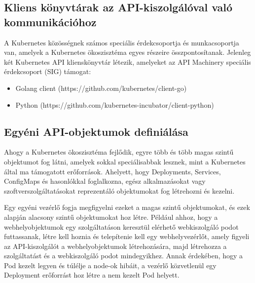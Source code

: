 \subsection{Kliens könyvtárak az API-kiszolgálóval való kommunikációhoz}
A Kubernetes közösségnek számos speciális érdekcsoportja és munkacsoportja van, amelyek a Kubernetes ökoszisztéma egyes részeire összpontosítanak. Jelenleg két Kubernetes API klienskönyvtár létezik, amelyeket az API Machinery speciális érdekcsoport (SIG) támogat:
\cite{Marko17}

\begin{itemize}
    \item Golang client (https://github.com/kubernetes/client-go)
    \item Python (https://github.com/kubernetes-incubator/client-python)
\end{itemize}

\subsection{Egyéni API-objektumok definiálása}
Ahogy a Kubernetes ökoszisztéma fejlődik, egyre több és több magas szintű objektumot fog
látni, amelyek sokkal speciálisabbak lesznek, mint a Kubernetes által ma támogatott
erőforrások. Ahelyett, hogy Deployments, Services, ConfigMaps és hasonlókkal foglalkozna,
egész alkalmazásokat vagy szoftverszolgáltatásokat reprezentáló objektumokat fog létrehozni
és kezelni.

Egy egyéni vezérlő fogja megfigyelni ezeket a magas szintű objektumokat, és ezek alapján alacsony szintű objektumokat hoz létre. Például ahhoz, hogy a webhelyobjektumok egy szolgáltatáson keresztül elérhető webkiszolgáló podot futtassanak, létre kell hoznia és telepítenie kell egy webhelyvezérlőt, amely figyeli az API-kiszolgálót a webhelyobjektumok létrehozására, majd létrehozza a szolgáltatást és a webkiszolgáló podot mindegyikhez. Annak érdekében, hogy a Pod kezelt legyen és túlélje a node-ok hibáit, a vezérlő közvetlenül egy Deployment erőforrást hoz létre a nem kezelt Pod helyett.
\cite{Marko17}

